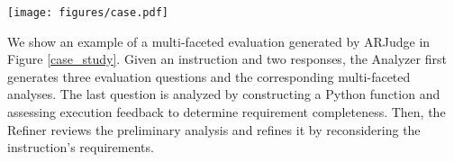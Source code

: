 \begin{table}[t!]
\center
{}
\caption{Ratio of change after refining. ``W$\rightarrow$C'' denotes a judgment changing from wrong to correct after refinement, while ``C$\rightarrow$W'' denotes the opposite.}
\label{refine}
\end{table}

\begin{figure*}[t!]
	\centering
	\texttt{[image: figures/case.pdf]}
	\caption{An example of evaluation generated by ARJudge.}
	\label{case_study}
\end{figure*}

We show an example of a multi-faceted evaluation generated by ARJudge in Figure \ref{case_study}. Given an instruction and two responses, the Analyzer first generates three evaluation questions and the corresponding multi-faceted analyses. The last question is analyzed by constructing a Python function and assessing execution feedback to determine requirement completeness. Then, the Refiner reviews the preliminary analysis and refines it by reconsidering the instruction's requirements. 
